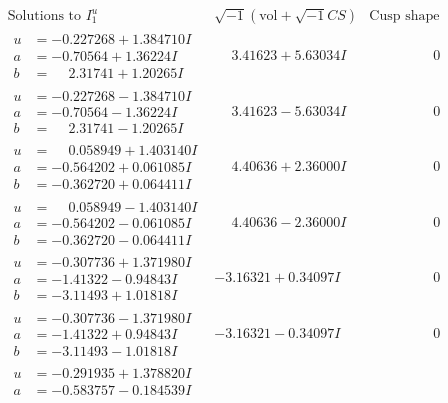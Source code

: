 \documentclass[1p]{elsarticle_modified}
\theoremstyle{definition}
\newcommand{\I}{\sqrt{-1}}
\begin{document}
$$\begin{array}{c|c|c}
\text{Solutions to }I^u_{1}& \I (\text{vol} + \sqrt{-1}CS) & \text{Cusp shape}\\
 \hline 
\begin{aligned}
u &= -0.227268 + 1.384710 I \\
a &= -0.70564 + 1.36224 I \\
b &= \phantom{-}2.31741 + 1.20265 I\end{aligned}
 & \phantom{-}3.41623 + 5.63034 I & \phantom{-0.000000 } 0 \\ \hline\begin{aligned}
u &= -0.227268 - 1.384710 I \\
a &= -0.70564 - 1.36224 I \\
b &= \phantom{-}2.31741 - 1.20265 I\end{aligned}
 & \phantom{-}3.41623 - 5.63034 I & \phantom{-0.000000 } 0 \\ \hline\begin{aligned}
u &= \phantom{-}0.058949 + 1.403140 I \\
a &= -0.564202 + 0.061085 I \\
b &= -0.362720 + 0.064411 I\end{aligned}
 & \phantom{-}4.40636 + 2.36000 I & \phantom{-0.000000 } 0 \\ \hline\begin{aligned}
u &= \phantom{-}0.058949 - 1.403140 I \\
a &= -0.564202 - 0.061085 I \\
b &= -0.362720 - 0.064411 I\end{aligned}
 & \phantom{-}4.40636 - 2.36000 I & \phantom{-0.000000 } 0 \\ \hline\begin{aligned}
u &= -0.307736 + 1.371980 I \\
a &= -1.41322 - 0.94843 I \\
b &= -3.11493 + 1.01818 I\end{aligned}
 & -3.16321 + 0.34097 I & \phantom{-0.000000 } 0 \\ \hline\begin{aligned}
u &= -0.307736 - 1.371980 I \\
a &= -1.41322 + 0.94843 I \\
b &= -3.11493 - 1.01818 I\end{aligned}
 & -3.16321 - 0.34097 I & \phantom{-0.000000 } 0 \\ \hline\begin{aligned}
u &= -0.291935 + 1.378820 I \\
a &= -0.583757 - 0.184539 I \\

\end{aligned}
\end{array}$$
\end{document}
